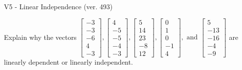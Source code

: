 \begin{exercise}
  \begin{exerciseTitle}V5 - Linear Independence (ver. 493)\end{exerciseTitle}
  \begin{exerciseStatement}
    Explain why the vectors \(\left[\begin{array}{r}
-3 \\
-3 \\
-6 \\
4 \\
-3
\end{array}\right] , \left[\begin{array}{r}
4 \\
-5 \\
-5 \\
-4 \\
-3
\end{array}\right] , \left[\begin{array}{r}
5 \\
14 \\
23 \\
-8 \\
12
\end{array}\right] , \left[\begin{array}{r}
0 \\
1 \\
0 \\
-1 \\
4
\end{array}\right] , \text{ and } \left[\begin{array}{r}
5 \\
-13 \\
-16 \\
-4 \\
-9
\end{array}\right]\) are linearly dependent or linearly independent.	



\end{exerciseStatement}
\end{exercise}
